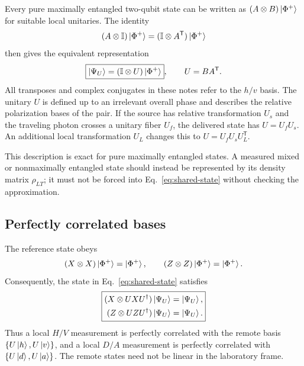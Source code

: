 \documentclass[a4paper,10pt]{article}
\newcommand{\I}{\mathbb{I}}
\begin{document}
Every pure maximally entangled two-qubit state can be written as
$(A\otimes B)\ket{\Phi^+}$ for suitable local unitaries. The identity
\begin{equation}
    (A\otimes\I)\ket{\Phi^+}
    =(\I\otimes A^{\mathsf T})\ket{\Phi^+}
    \label{eq:bell-transpose-identity}
\end{equation}
then gives the equivalent representation
\begin{equation}
    \boxed{\ket{\Psi_U}=(\I\otimes U)\ket{\Phi^+}},
    \qquad U=BA^{\mathsf T}.
    \label{eq:shared-state}
\end{equation}
All transposes and complex conjugates in these notes refer to the $h/v$
basis. The unitary $U$ is defined up to an irrelevant overall phase and
describes the relative polarization bases of the pair. If the source has
relative transformation $U_s$ and the traveling photon crosses a unitary
fiber $U_f$, the delivered state has $U=U_fU_s$. An additional local
transformation $U_L$ changes this to $U=U_fU_sU_L^{\mathsf T}$.

This description is exact for pure maximally entangled states. A measured
mixed or nonmaximally entangled state should instead be represented by its
density matrix $\rho_{LT}$; it must not be forced into
Eq.~\eqref{eq:shared-state} without checking the approximation.

\subsection{Perfectly correlated bases}

The reference state obeys
\begin{equation}
    (X\otimes X)\ket{\Phi^+}=\ket{\Phi^+},
    \qquad
    (Z\otimes Z)\ket{\Phi^+}=\ket{\Phi^+}.
\end{equation}
Consequently, the state in Eq.~\eqref{eq:shared-state} satisfies
\begin{equation}
    \boxed{
    \begin{aligned}
        (X\otimes UXU^\dagger)\ket{\Psi_U}&=\ket{\Psi_U},\\
        (Z\otimes UZU^\dagger)\ket{\Psi_U}&=\ket{\Psi_U}.
    \end{aligned}}
    \label{eq:matched-axes}
\end{equation}
Thus a local $H/V$ measurement is perfectly correlated with the remote
basis $\{U\ket h,U\ket v\}$, and a local $D/A$ measurement is perfectly
correlated with $\{U\ket d,U\ket a\}$. The remote states need not be linear
in the laboratory frame.
\end{document}
